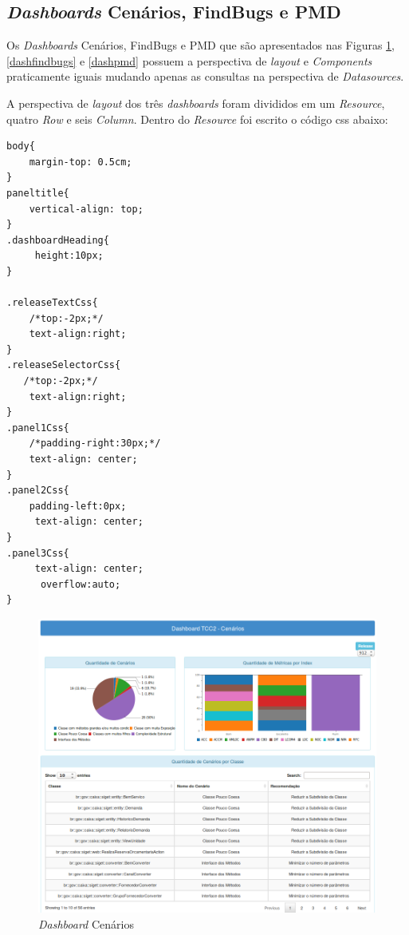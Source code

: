\begin{apendicesenv}
\section{\textit{Dashboards} Cenários, FindBugs e PMD}

Os \textit{Dashboards} Cenários, FindBugs e PMD que são apresentados nas Figuras \ref{dashcenario}, \ref{dashfindbugs} e \ref{dashpmd} possuem a perspectiva de \textit{layout} e \textit{Components} praticamente iguais mudando apenas as consultas na perspectiva de \textit{Datasources}.


A perspectiva de \textit{layout} dos três \textit{dashboards} foram divididos em um \textit{Resource}, quatro \textit{Row} e seis \textit{Column}. Dentro do \textit{Resource} foi escrito o código css abaixo:

{\color{blue}
\begin{verbatim}
body{
    margin-top: 0.5cm;
} 
paneltitle{
    vertical-align: top; 
}
.dashboardHeading{
     height:10px;
}

.releaseTextCss{
    /*top:-2px;*/  
    text-align:right;
} 
.releaseSelectorCss{
   /*top:-2px;*/  
    text-align:right;
}
.panel1Css{
    /*padding-right:30px;*/
    text-align: center;  
}
.panel2Css{
    padding-left:0px;
     text-align: center;  
}
.panel3Css{
     text-align: center;  
      overflow:auto; 
}

\end{verbatim}
}

\begin{figure}[H]
\centering
\includegraphics[keepaspectratio=false,scale=0.50]{figuras/figuras_nilton/dashcenario.png}
\caption{\textit{Dashboard} Cenários}
\label{dashcenario}
\end{figure}


\end{apendicesenv}
